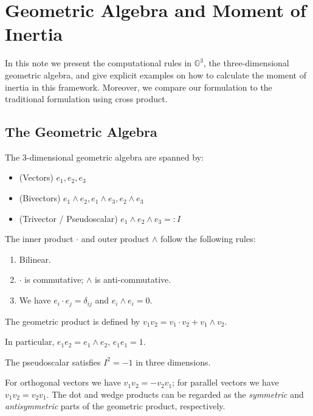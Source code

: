 
\section{Geometric Algebra and Moment of Inertia}


In this note we present the computational rules in $\mathbb{G}^3$, the three-dimensional geometric algebra, and give explicit examples on how to calculate the moment of inertia in this framework. Moreover, we compare our formulation to the traditional formulation using cross product.

\subsection{The Geometric Algebra}

\begin{definition}
	The 3-dimensional geometric algebra are spanned by:
	\begin{itemize}
		\item (Vectors) $e_1, e_2, e_3$
		\item (Bivectors) $e_1 \wedge e_2, e_1 \wedge e_3, e_2 \wedge e_3$
		\item (Trivector / Pseudoscalar) $e_1 \wedge e_2 \wedge e_3 =: I$
	\end{itemize}
	The inner product $\cdot$ and outer product $\wedge$ follow the following rules:
	\begin{enumerate}
		\item Bilinear.
		\item $\cdot$ is commutative;  $\wedge$ is anti-commutative.
		\item We have $e_i \cdot e_j = \delta_{ij}$ and $e_i \wedge e_i = 0$.
	\end{enumerate}
	The geometric product is defined by $v_1 v_2 = v_1 \cdot v_2 + v_1 \wedge v_2
	.$ 
\end{definition}
	In particular, $e_1 e_2 = e_1 \wedge e_2$, $e_1 e_1 = 1$.

	The pseudoscalar satisfies $I^2 = -1$ in three dimensions. 
\begin{remark}
	For orthogonal vectors we have $v_1 v_2 = -v_2 v_1$; for parallel vectors we have $v_1 v_2 = v_2 v_1$. The dot and wedge products can be regarded as the \textit{symmetric} and \textit{antisymmetric} parts of the geometric product, respectively.
\end{remark}

